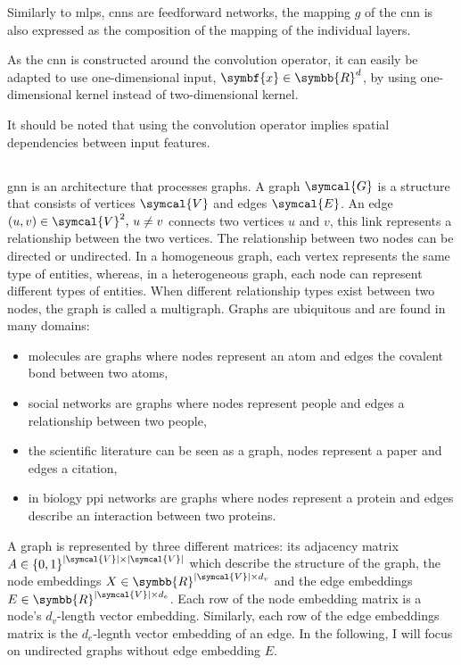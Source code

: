 \documentclass[../main.tex]{subfiles}
\begin{document}
	 Similarly to \glspl{mlp}, \glspl{cnn} are feedforward networks, the mapping \(g\) of the \gls{cnn} is also expressed as the composition of the mapping of the individual layers.

	 As the \gls{cnn} is constructed around the convolution operator, it can easily be adapted to use one-dimensional input, \(\symbf{x} \in \symbb{R}^d\), by using one-dimensional kernel instead of two-dimensional kernel.

	 It should be noted that using the convolution operator implies spatial dependencies between input features.

 \subsection{}
	 \Gls{gnn} is an architecture that processes graphs.
	 A graph \(\symcal{G}\) is a structure that consists of vertices \(\symcal{V}\) and edges \(\symcal{E}\).
	 An edge \(\left(u,v\right) \in \symcal{V}^2,\, u\neq v\) connects two vertices \(u\) and \(v\), this link represents a relationship between the two vertices.
	 The relationship between two nodes can be directed or undirected.
	 In a homogeneous graph, each vertex represents the same type of entities, whereas, in a heterogeneous graph, each node can represent different types of entities.
	 When different relationship types exist between two nodes, the graph is called a multigraph.
	 Graphs are ubiquitous and are found in many domains:
	 \begin{itemize}[nosep]
		 \item molecules are graphs where nodes represent an atom and edges the covalent bond between two atoms,
		 \item social networks are graphs where nodes represent people and edges a relationship between two people,
		 \item the scientific literature can be seen as a graph, nodes represent a paper and edges a citation,
		 \item in biology \gls{ppi} networks are graphs where nodes represent a protein and edges describe an interaction between two proteins.
	 \end{itemize}

	 A graph is represented by three different matrices: its adjacency matrix \(A \in {\left\{0,1\right\}}^{\left|\symcal{V}\right| \times \left|\symcal{V}\right|}\) which describe the structure of the graph, the node embeddings \(X \in \symbb{R}^{\left|\symcal{V}\right| \times d_v}\) and the edge embeddings \(E \in \symbb{R}^{\left|\symcal{V}\right| \times d_e}\).
	 Each row of the node embedding matrix is a node's \(d_v\)-length vector embedding.
	 Similarly, each row of the edge embeddings matrix is the \(d_e\)-legnth vector embedding of an edge.
	 In the following, I will focus on undirected graphs without edge embedding \(E\).
\end{document}
